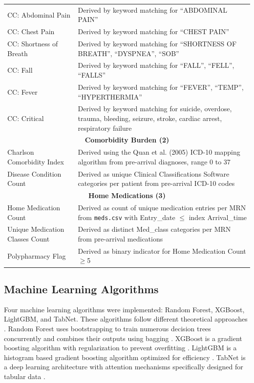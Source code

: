 \documentclass[harvard,article]{frontiersinFPHY_FAMS}
\begin{document}
\begin{table}[t]
\begin{tabularx}{\textwidth}{@{}p{3.5cm} X@{}}
CC: Abdominal Pain & Derived by keyword matching for ``ABDOMINAL PAIN'' \\
CC: Chest Pain & Derived by keyword matching for ``CHEST PAIN'' \\
CC: Shortness of Breath & Derived by keyword matching for ``SHORTNESS OF BREATH'', ``DYSPNEA'', ``SOB'' \\
CC: Fall & Derived by keyword matching for ``FALL'', ``FELL'', ``FALLS'' \\
CC: Fever & Derived by keyword matching for ``FEVER'', ``TEMP'', ``HYPERTHERMIA'' \\
CC: Critical & Derived by keyword matching for suicide, overdose, trauma, bleeding, seizure, stroke, cardiac arrest, respiratory failure \\
\midrule
\multicolumn{2}{c}{\textbf{Comorbidity Burden (2)}} \\
\midrule
Charlson Comorbidity Index & Derived using the Quan et al. (2005) ICD-10 mapping algorithm from pre-arrival diagnoses, range 0 to 37 \\
Disease Condition Count & Derived as unique Clinical Classifications Software categories per patient from pre-arrival ICD-10 codes \\
\midrule
\multicolumn{2}{c}{\textbf{Home Medications (3)}} \\
\midrule
Home Medication Count & Derived as count of unique medication entries per MRN from \texttt{meds.csv} with Entry\_date $\leq$ index Arrival\_time \\
Unique Medication Classes Count & Derived as distinct Med\_class categories per MRN from pre-arrival medications \\
Polypharmacy Flag & Derived as binary indicator for Home Medication Count $\geq$5 \\
\bottomrule
\end{tabularx}
\end{table}

\subsection{Machine Learning Algorithms}

Four machine learning algorithms were implemented: Random Forest, XGBoost, LightGBM, and TabNet. These algorithms follow different theoretical approaches \cite{ricciardi2024, wu2025}. Random Forest \cite{breiman2001} uses bootstrapping to train numerous decision trees concurrently and combines their outputs using bagging \cite{ricciardi2024}. XGBoost \cite{chen2016} is a gradient boosting algorithm with regularization to prevent overfitting \cite{wang2025}. LightGBM \cite{ke2017} is a histogram based gradient boosting algorithm optimized for efficiency \cite{wu2025}. TabNet \cite{arik2021} is a deep learning architecture with attention mechanisms specifically designed for tabular data \cite{lin2024}.
\end{document}

